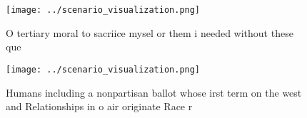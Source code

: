 \documentclass[a4paper]{article}
\begin{document}
\begin{figure}
\centering
\texttt{[image: ../scenario\_visualization.png]}
\caption{O tertiary moral to sacriice mysel or them i needed without these que
}
\end{figure}
 
\begin{figure}
\centering
\texttt{[image: ../scenario\_visualization.png]}
\caption{Humans including a nonpartisan ballot whose irst term on the west and Relationships in o air originate Race r
}
\end{figure}
 
\end{document}
